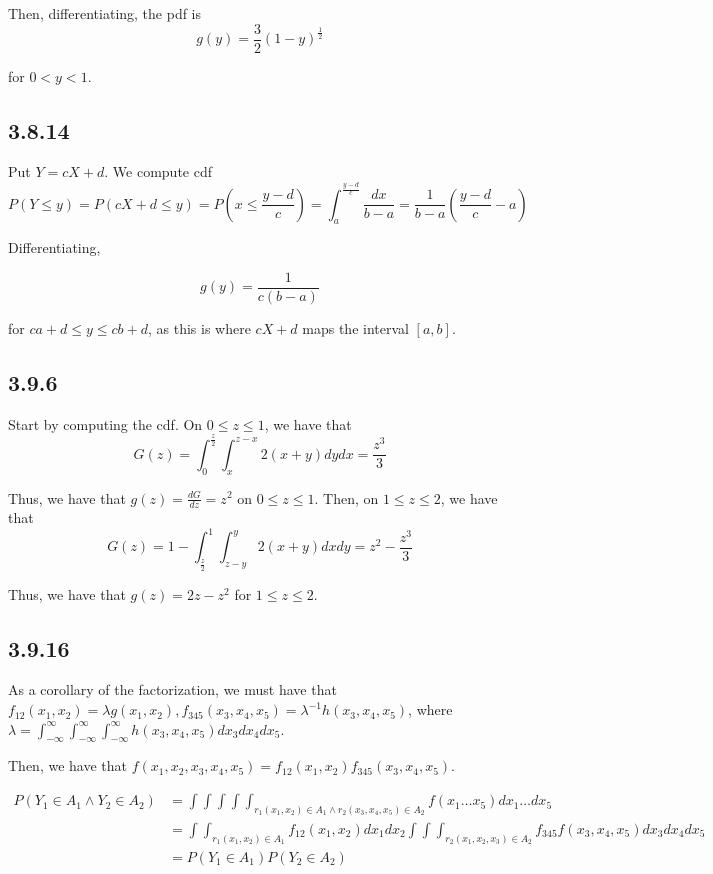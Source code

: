 \documentclass[12pt,letterpaper]{article}
\theoremstyle{definition}
\begin{document}
Then, differentiating, the pdf is
\[
  g(y) = \frac{3}{2}(1-y)^{\frac{1}{2}}
\]

for $0 < y < 1$.

\subsection*{3.8.14}

Put $Y = cX + d$. We compute cdf
\[
  P(Y \leq y) = P(cX + d \leq y) = P(x \leq \frac{y - d}{c}) =
  \int_{a}^{\frac{y-d}{c}}\frac{dx}{b-a} = \frac{1}{b-a}(\frac{y-d}{c} - a)
\]

Differentiating,

\[
  g(y) = \frac{1}{c(b-a)}
\]

for $ca + d \leq y \leq cb + d$, as this is where $cX + d$ maps the interval
$[a, b]$.

\subsection*{3.9.6}

Start by computing the cdf. On $0 \leq z \leq 1$, we have that
\[
  G(z) = \int_0^{\frac{z}{2}}\int_x^{z-x}2(x+y)dydx = \frac{z^3}{3}
\]

Thus, we have that $g(z) = \frac{dG}{dz} = z^2$ on $0 \leq z \leq 1$. Then,
on $1 \leq z \leq 2$, we have that
\[
  G(z) = 1 - \int_{\frac{z}{2}}^1\int_{z-y}^y2(x+y)dxdy = z^2 - \frac{z^3}{3}
\]

Thus, we have that $g(z) = 2z-z^2$ for $1 \leq z \leq 2$.

\subsection*{3.9.16}

As a corollary of the factorization, we must have that $f_{12}(x_1, x_2) =
\lambda g(x_1, x_2), f_{345}(x_3, x_4, x_5) = \lambda^{-1}h(x_3, x_4, x_5)$,
where $\lambda = \int_{-\infty}^\infty\int_{-\infty}^\infty\int_{-\infty}^\infty h(x_3, x_4, x_5)dx_3dx_4dx_5$.

Then, we have that $f(x_1, x_2, x_3, x_4, x_5) = f_{12}(x_1, x_2)f_{345}(x_3,
x_4, x_5)$.

\begin{align*}
  P(Y_1 \in A_1 \land Y_2 \in A_2) &= \int\int\int\int\int_{r_1(x_1, x_2) \in A_1 \land r_2(x_3, x_4, x_5) \in A_2}f(x_1 \dots x_5)dx_1\dots dx_5  \\
                                   &= \int\int_{r_1(x_1, x_2) \in A_1}f_{12}(x_1,x_2)dx_1dx_2 \int\int\int_{r_2(x_1, x_2, x_3)\in A_2}f_{345}f(x_3, x_4,x_5)dx_3dx_4dx_5 \\
                                   &= P(Y_1 \in A_1)P(Y_2 \in A_2)
\end{align*}
\end{document}
